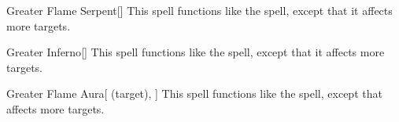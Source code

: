\lowercase{\hypertarget{spell:Greater Flame Serpent}{}}\label{spell:Greater Flame Serpent}
\begin{freeability}[Rank 6]{\hypertarget{spell:Greater Flame Serpent}{Greater Flame Serpent}}[]
This spell functions like the  spell, except that it affects more targets.
\end{freeability}
\vspace{0.25em}



\lowercase{\hypertarget{spell:Greater Inferno}{}}\label{spell:Greater Inferno}
\begin{freeability}[Rank 6]{\hypertarget{spell:Greater Inferno}{Greater Inferno}}[]
This spell functions like the  spell, except that it affects more targets.
\end{freeability}
\vspace{0.25em}



\lowercase{\hypertarget{spell:Greater Flame Aura}{}}\label{spell:Greater Flame Aura}
\begin{attuneability}[Rank 7]{\hypertarget{spell:Greater Flame Aura}{Greater Flame Aura}}[ (target), ]
This spell functions like the  spell, except that affects more targets.
\end{attuneability}
\vspace{0.25em}


